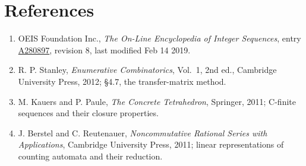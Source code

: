 \documentclass[11pt]{article}
\theoremstyle{definition}
\begin{document}
\section{References}

\begin{enumerate}

\item OEIS Foundation Inc., \emph{The On-Line Encyclopedia of Integer Sequences}, entry \href{https://oeis.org/A280897}{A280897}, revision 8, last modified Feb 14 2019.

\item R. P. Stanley, \emph{Enumerative Combinatorics}, Vol.~1, 2nd ed., Cambridge University Press, 2012; \S4.7, the transfer-matrix method.

\item M. Kauers and P. Paule, \emph{The Concrete Tetrahedron}, Springer, 2011; C-finite sequences and their closure properties.

\item J. Berstel and C. Reutenauer, \emph{Noncommutative Rational Series with Applications}, Cambridge University Press, 2011; linear representations of counting automata and their reduction.

\end{enumerate}
\end{document}
